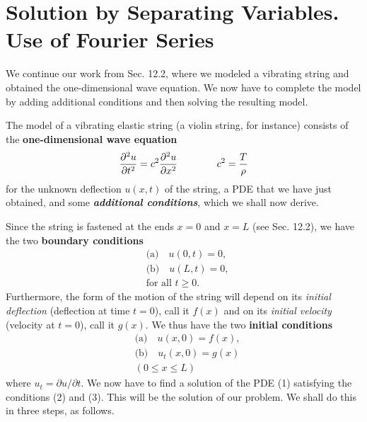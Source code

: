 \documentclass[twocolumn, 12pt, leqno, oneside]{amsart}
\begin{document}
\section{Solution by Separating Variables.\\
Use of Fourier Series}

We continue our work from Sec. 12.2, where we modeled a vibrating string and 
obtained the one-dimensional wave equation. We now have to complete the model 
by adding additional conditions and then solving the resulting model.

The model of a vibrating elastic string (a violin string, for instance)
consists of the \textbf{one-dimensional wave equation}
\begin{equation}
    \frac{\partial^2{u}}{\partial{t^2}} = c^2\frac{\partial^2{u} \\
        }{\partial{x^2}} \qquad \qquad c^2 = \frac{T}{\rho}
\end{equation}
for the unknown deflection $u(x,t)$ of the string, a PDE that we have just 
obtained, and some \textbf{\emph{additional conditions}}, which we shall now 
derive.

Since the string is fastened at the ends $x=0$ and $x=L$ (see Sec. 12.2), we 
have the two \textbf{boundary conditions}
\begin{equation}
  \begin{split}
       &\text{(a)} \quad u(0,t) = 0, \\
       &\text{(b)} \quad u(L,t) = 0, \\
       &\text{for all } t \geq 0.
  \end{split}
\end{equation}
Furthermore, the form of the motion of the string will depend on its
\emph{initial deflection} (deflection at time $t=0$), call it $f(x)$ and on 
its \emph{initial velocity} (velocity at $t=0$), call it $g(x)$.
We thus have the two \textbf{initial conditions}
\begin{equation}
  \begin{split}
        &\text{(a)} \quad u(x,0) = f(x), \\
        &\text{(b)} \quad u_t(x,0) = g(x) \\
        & (0 \leq x \leq L)
  \end{split}
\end{equation}
where $u_t=\partial u/\partial t$. We now have to find a solution of the PDE 
(1) satisfying the conditions (2) and (3). This will be the solution of our 
problem. We shall do this in three steps, as follows.
\end{document}
